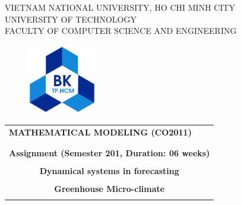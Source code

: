 \documentclass[a4paper]{article}
\begin{document}
\nocite{*} %

\begin{titlepage}
  \begin{center}
    VIETNAM NATIONAL UNIVERSITY, HO CHI MINH CITY \\
    UNIVERSITY OF TECHNOLOGY \\
    FACULTY OF COMPUTER SCIENCE AND ENGINEERING
  \end{center}

  \vspace{1cm}

  \begin{figure}[h!]
    \begin{center}
      \includegraphics[width=3cm]{hcmut.png}
    \end{center}
  \end{figure}

  \vspace{1cm}

  \begin{center}
    \begin{tabular}{c}
      \multicolumn{1}{l}{\textbf{{\Large MATHEMATICAL MODELING  (CO2011)}}}               \\
      {}                                                                                  \\
      \hline
      \\
      \multicolumn{1}{l}{\textbf{{\Large Assignment (Semester 201, Duration: 06 weeks)}}} \\
      \\
      \textbf{{\Huge Dynamical systems in forecasting}}                                   \\
      \\
      \textbf{{\Huge Greenhouse Micro-climate}}                                           \\
      \\
      \hline
    \end{tabular}
  \end{center}

  \vspace{3cm}


\end{titlepage}
\end{document}
